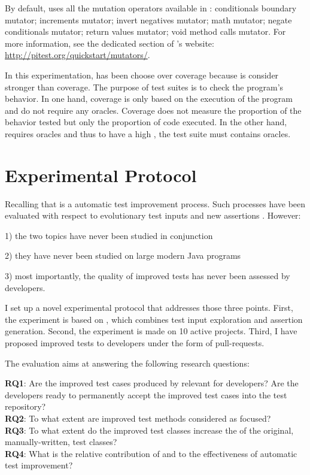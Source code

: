 By default, \dspot uses all the mutation operators available in \pitest: 
conditionals boundary mutator;
increments mutator;
invert negatives mutator;
math mutator;
negate conditionals mutator;
return values mutator;
void method calls mutator.
For more information, see the dedicated section of \pitest's website: \url{http://pitest.org/quickstart/mutators/}.

In this experimentation, \ms has been choose over coverage because \ms is consider stronger than coverage.
The purpose of test suites is to check the program's behavior.
In one hand, coverage is only based on the execution of the program and do not require any oracles.
Coverage does not measure the proportion of the behavior tested but only the proportion of code executed.
In the other hand, \ms requires oracles and thus to have a high \ms, the test suite must contains oracles.

\section{Experimental  Protocol}
\label{sec:test-improvement:experiment-protocol}

Recalling that \dspot is a automatic test improvement process.
Such processes have been evaluated with respect to evolutionary test inputs \cite{tonella} and new assertions \cite{Xie2006}.
However:

1) the two topics have never been studied in conjunction

2) they have never been studied on large modern Java programs

3) most importantly, the quality of improved tests has never been assessed by developers.

I set up a novel experimental protocol that addresses those three points.
First, the experiment is based on \dspot, which combines test input exploration and assertion generation.
Second, the experiment is made on 10 active \gh projects.
Third, I have proposed improved tests to developers under the form of pull-requests.

The evaluation aims at answering the following research questions:

\newcommand\rqpullrequest{RQ1\xspace}
\newcommand\rqcandidates{RQ2\xspace}
\newcommand\rqeffectiveness{RQ3\xspace}
\newcommand\rqAmplVersusIAmpl{RQ4\xspace}

\noindent\textbf{\rqpullrequest}: Are the improved test cases produced by \dspot relevant for developers? Are the developers ready to permanently accept the improved test cases into the test repository?\\
\textbf{\rqcandidates}: To what extent are improved test methods considered as focused?\\
\textbf{\rqeffectiveness}: To what extent do the improved test classes increase the \ms of the original,  manually-written, test classes?\\
\textbf{\rqAmplVersusIAmpl}: What is the relative contribution of \Iampl{} and \Aampl{} to the effectiveness of automatic test improvement?\\

